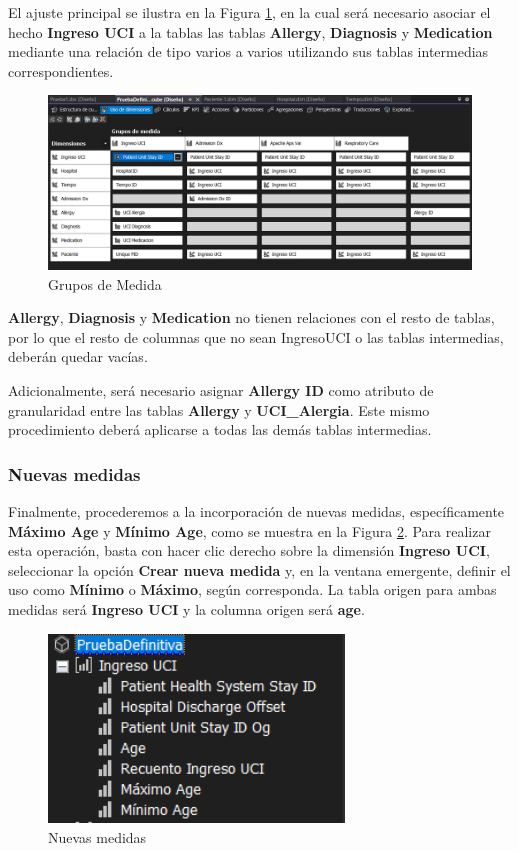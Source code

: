\documentclass[12pt, a4paper, twoside]{article}
\begin{document}
El ajuste principal se ilustra en la Figura \ref{fig:30}, en la cual será necesario asociar el hecho \textbf{Ingreso UCI} a la tablas  las tablas \textbf{Allergy}, \textbf{Diagnosis} y \textbf{Medication} mediante una relación de tipo varios a varios utilizando sus tablas intermedias correspondientes.

\begin{figure}[H]
	\centering
	\includegraphics[width=1\textwidth]{image/gruposMedida}
	\caption{Grupos de Medida}
	\label{fig:30}
\end{figure}

\textbf{Allergy}, \textbf{Diagnosis} y \textbf{Medication} no tienen relaciones con el resto de tablas, por lo que el resto de columnas que no sean IngresoUCI o las tablas intermedias, deberán quedar vacías.

Adicionalmente, será necesario asignar \textbf{Allergy ID} como atributo de granularidad entre las tablas \textbf{Allergy} y \textbf{UCI\_Alergia}. Este mismo procedimiento deberá aplicarse a todas las demás tablas intermedias.

\subsubsection{Nuevas medidas}

Finalmente, procederemos a la incorporación de nuevas medidas, específicamente \textbf{Máximo Age} y \textbf{Mínimo Age}, como se muestra en la Figura \ref{fig:32}. Para realizar esta operación, basta con hacer clic derecho sobre la dimensión \textbf{Ingreso UCI}, seleccionar la opción \textbf{Crear nueva medida} y, en la ventana emergente, definir el uso como \textbf{Mínimo} o \textbf{Máximo}, según corresponda. La tabla origen para ambas medidas será \textbf{Ingreso UCI} y la columna origen será \textbf{age}.

\begin{figure}[H]
	\centering
	\includegraphics[width=0.7\textwidth]{image/medidasNuevas}
	\caption{Nuevas medidas}
	\label{fig:32}
\end{figure}
\end{document}

